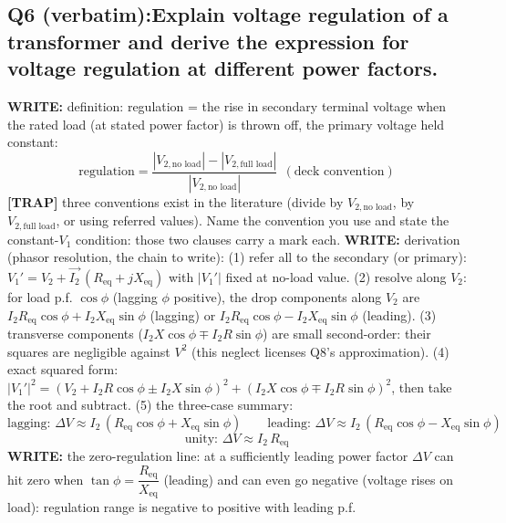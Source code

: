 \documentclass[11pt]{article}
\newcommand{\q}[2]{\subsection*{\color{copper}#1\quad\color{iron}#2}}
\newcommand{\w}[1]{\textbf{\color{copper}WRITE:} #1}
\newcommand{\tr}[1]{\textbf{\color{red}[TRAP]} #1}
\begin{document}
\q{Q6 (verbatim):}{Explain voltage regulation of a transformer and derive the expression for voltage regulation at different power factors.}
\w{definition:} regulation = the rise in secondary terminal voltage when the rated load (at stated power factor) is thrown off, the primary voltage held constant:
\[
\text{regulation} = \dfrac{|V_{2,\text{no load}}| - |V_{2,\text{full load}}|}{|V_{2,\text{no load}}|}\ \ (\text{deck convention})
\]
\tr{three conventions exist in the literature (divide by $V_{2,\text{no load}}$, by $V_{2,\text{full load}}$, or using referred values). Name the convention you use and state the constant-$V_1$ condition: those two clauses carry a mark each.}
\w{derivation (phasor resolution, the chain to write):} (1) refer all to the secondary (or primary): $V_1' = V_2 + \vec{I_2}\, (R_{\text{eq}} + j X_{\text{eq}})$ with $|V_1'|$ fixed at no-load value. (2) resolve along $V_2$: for load p.f. $\cos\phi$ (lagging $\phi$ positive), the drop components along $V_2$ are $I_2 R_{\text{eq}} \cos\phi + I_2 X_{\text{eq}} \sin\phi$ (lagging) or $I_2 R_{\text{eq}} \cos\phi - I_2 X_{\text{eq}} \sin\phi$ (leading). (3) transverse components ($I_2 X \cos\phi \mp I_2 R \sin\phi$) are small second-order: their squares are negligible against $V^2$ (this neglect licenses Q8's approximation). (4) exact squared form: $|V_1'|^{2} = (V_2 + I_2 R \cos\phi \pm I_2 X \sin\phi)^{2} + (I_2 X \cos\phi \mp I_2 R \sin\phi)^{2}$, then take the root and subtract. (5) the three-case summary:
\[
\text{lagging: } \Delta V \approx I_2\,(R_{\text{eq}} \cos\phi + X_{\text{eq}} \sin\phi)
\qquad
\text{leading: } \Delta V \approx I_2\,(R_{\text{eq}} \cos\phi - X_{\text{eq}} \sin\phi)
\]
\[
\text{unity: } \Delta V \approx I_2\, R_{\text{eq}}
\]
\w{the zero-regulation line:} at a sufficiently leading power factor $\Delta V$ can hit zero when $\tan\phi = \dfrac{R_{\text{eq}}}{X_{\text{eq}}}$ (leading) and can even go negative (voltage rises on load): regulation range is negative to positive with leading p.f.
\end{document}
